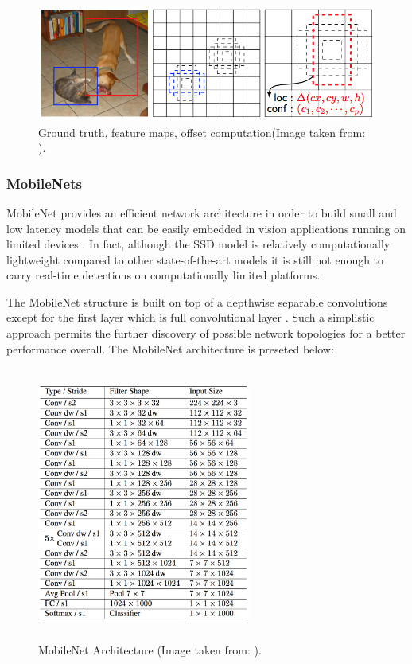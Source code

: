 \begin{figure}[!htbp]
\begin{center}
\includegraphics[width=\linewidth]{images/gt_boxes.png}
\end{center}
\caption{Ground truth, feature maps, offset computation(Image taken from: \cite{paper:SSD}).}
\label{fig:ssdGT}
\end{figure}

\subsubsection{MobileNets}

MobileNet provides an efficient network architecture in order to build small and low latency models that can be easily embedded in vision applications running on limited devices \cite{paper:MobileNets}. In fact, although the SSD model is relatively computationally lightweight compared to other state-of-the-art models it is still not enough to carry real-time detections on computationally limited platforms.

The MobileNet structure is built on top of a depthwise separable convolutions except for the first layer which is full convolutional layer \cite{paper:MobileNets}. Such a simplistic approach permits the further discovery of possible network topologies for a better performance overall. The MobileNet architecture is preseted below:

\begin{figure}[!htbp]
\begin{center}
\includegraphics[width=7cm,height=9cm,keepaspectratio]{images/mobileNet_structure.png}
\end{center}
\caption{MobileNet Architecture (Image taken from: \cite{paper:MobileNets}).}
\end{figure}


